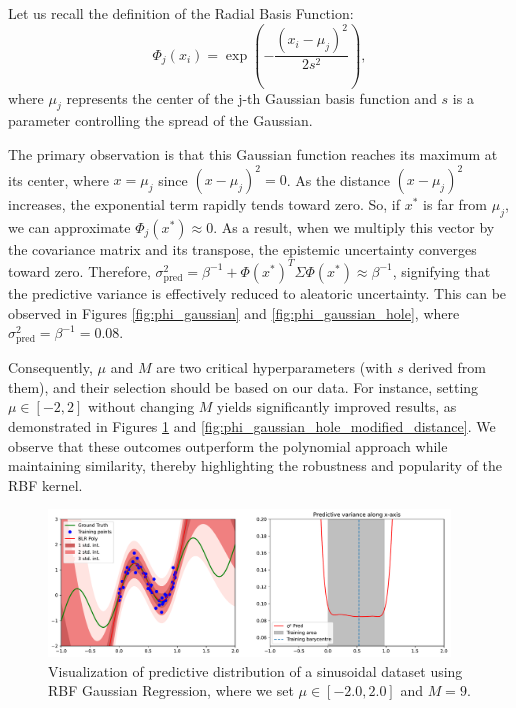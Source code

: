 Let us recall the definition of the Radial Basis Function:
\[ \Phi_j(x_i) = \exp\left( - \frac{(x_i - \mu_j)^2}{2s^2} \right), \]
where $\mu_j$ represents the center of the j-th Gaussian basis function and $s$ is a parameter controlling the spread of the Gaussian.

The primary observation is that this Gaussian function reaches its maximum at its center, where $x = \mu_j$ since $(x - \mu_j)^2 = 0$. As the distance $(x - \mu_j)^2$ increases, the exponential term rapidly tends toward zero. So, if $x^*$ is far from $\mu_j$, we can approximate $\Phi_j(x^*) \approx 0$. As a result, when we multiply this vector by the covariance matrix and its transpose, the epistemic uncertainty converges toward zero. Therefore, $\sigma_{\text{pred}}^2 = \beta^{-1} + \Phi(x^*)^T \Sigma \Phi(x^*) \approx \beta^{-1}$, signifying that the predictive variance is effectively reduced to aleatoric uncertainty. This can be observed in Figures \ref{fig:phi_gaussian} and \ref{fig:phi_gaussian_hole}, where $\sigma_{\text{pred}}^2 = \beta^{-1} = 0.08$.

Consequently, $\mu$ and $M$ are two critical hyperparameters (with $s$ derived from them), and their selection should be based on our data. For instance, setting $\mu \in [-2, 2]$ without changing $M$ yields significantly improved results, as demonstrated in Figures \ref{fig:phi_gaussian_modified_distance} and \ref{fig:phi_gaussian_hole_modified_distance}. We observe that these outcomes outperform the polynomial approach while maintaining similarity, thereby highlighting the robustness and popularity of the RBF kernel.

\begin{figure}[H]
    \centering
    \includegraphics[width=0.95\textwidth]{phi_gaussian_modified_distance.pdf}
    \caption{Visualization of predictive distribution of a sinusoidal dataset using RBF Gaussian Regression, where we set $\mu \in [-2.0, 2.0]$ and $M = 9$.}
    \label{fig:phi_gaussian_modified_distance}
\end{figure}

